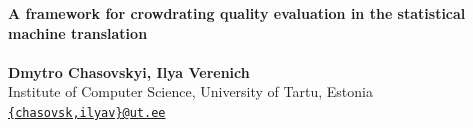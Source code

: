 \documentclass[a0,portrait]{a0poster}
\begin{document}


\begin{minipage}[b]{0.75\linewidth}
\veryHuge \color{NavyBlue} \textbf{A framework for crowdrating quality evaluation in the statistical machine translation} \color{Black}\\ %
\\
\huge \textbf{Dmytro  Chasovskyi, Ilya Verenich}\\[0.5cm] %
\Large Institute of Computer Science, University of Tartu, Estonia\\[0.4cm] %
\Large \texttt{\href{mailto:chasovsk@ut.ee}{\{chasovsk,ilyav\}@ut.ee}} \\
\end{minipage}
%
\end{document}
